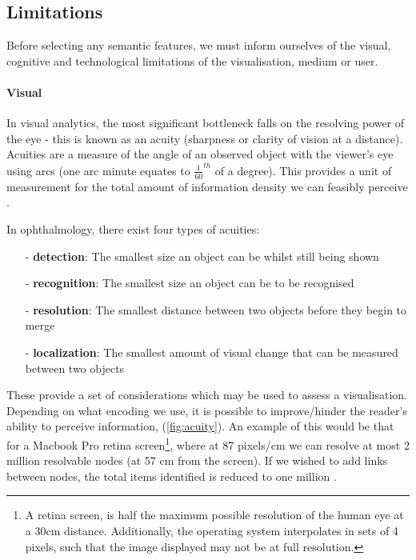 \subsection{Limitations}

Before selecting any semantic features, we must inform ourselves of the visual, cognitive and technological limitations of the visualisation, medium or user.

\paragraph{Visual}
In visual analytics, the most significant bottleneck falls on the resolving power of the eye - this is known as an acuity (sharpness or clarity of vision at a distance). Acuities are a measure of the angle of an observed object with the viewer's eye using arcs (one arc minute equates to $\frac{1}{60}^{th}$ of a degree). This provides a unit of measurement for the total amount of information density we can feasibly perceive \citep{ware}.

 In ophthalmology, there exist four types of  acuities:
\begin{itemize}
\item[-] \textbf{detection}: The smallest size an object can be whilst still being shown
\item[-] \textbf{recognition}: The smallest size an object can be to be recognised
\item[-] \textbf{resolution}: The smallest distance between two objects before they begin to merge
\item[-] \textbf{localization}: The smallest amount of visual change that can be measured between two objects
\end{itemize}

These provide a set of considerations which may be used to assess a visualisation. Depending on what encoding we use, it is possible to improve/hinder the reader's ability to perceive information, (\autoref{fig:acuity}). An example of this would be that for a Macbook Pro retina screen\footnote{A retina screen, is half the maximum possible resolution of the human eye at a 30cm distance. Additionally, the operating system interpolates in sets of 4 pixels, such that the image displayed may not be at full resolution.}, where at 87 pixels/cm we can resolve at most 2 million resolvable nodes (at 57 cm from the screen). If we wished to add links between nodes, the total items identified is reduced to one million
\citep{ch10}.

